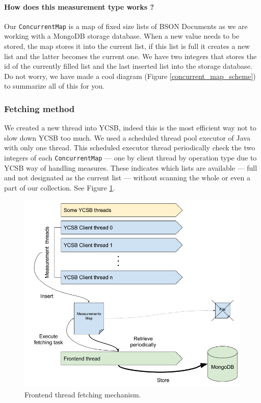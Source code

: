 \documentclass[a4paper,11pt]{report}
\begin{document}
\paragraph{How does this measurement type works ?}  Our \texttt{ConcurrentMap} is a map of fixed size lists of BSON Documents as we are working with a MongoDB storage database. When a new value needs to be stored, the map stores it into the current list, if this list is full it creates a new list and the latter becomes the current one. We have two integers that stores the id of the currently filled list and the last inserted list into the storage database. Do not worry, we have made a cool diagram (Figure \ref{concurrent_map_scheme}) to summarize all of this for you.

\subsubsection{Fetching method}

We created a new thread into YCSB, indeed this is the most efficient way not to slow down YCSB too much. We used a scheduled thread pool executor of Java with only one thread. This scheduled executor thread periodically check the two integers of each \texttt{ConcurrentMap} --- one by client thread by operation type due to YCSB way of handling measures. These indicates which lists are available --- full and not designated as the current list --- without scanning the whole or even a part of our collection. See Figure \ref{threads_report}.

\begin{figure}[ht]
\begin{center}
\includegraphics[width=1\linewidth]{images/threads_report.png}
\caption{Frontend thread fetching mechanism.}
\label{threads_report}
\end{center}
\end{figure}
\end{document}
